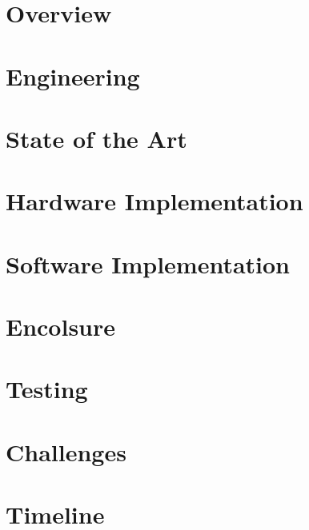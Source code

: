 \documentclass[11pt,letterpaper]{article}
\begin{document}
\section{Overview}
\label{sec:overview}

\clearpage

\section{Engineering}
\label{sec:engineering}

\clearpage

\section{State of the Art}
\label{sec:state-of-the-art}

\clearpage

\section{Hardware Implementation}
\label{sec:hardware}

\clearpage

\section{Software Implementation}
\label{sec:software}

\clearpage

\section{Encolsure}
\label{sec:enclosure}

\clearpage

\section{Testing}
\label{sec:testing}

\clearpage

\section{Challenges}
\label{sec:challenges}

\clearpage

\section{Timeline}
\label{sec:timeline}

\clearpage
\end{document}
